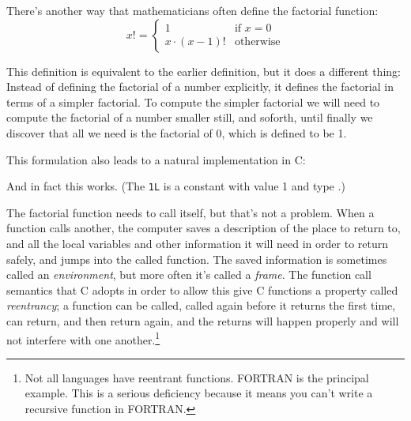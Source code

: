 There's another way that mathematicians often define the factorial
function:
\[ x! = \left\{ \begin{array}{ll}
	       1  & \mbox{if $x = 0$} \\
	       x\cdot(x-1)! & \mbox{otherwise}
		\end{array}
\right. \]

This definition is equivalent to the earlier definition, but it does a
different thing:  Instead of defining the factorial of a number
explicitly, it defines the factorial in terms of a simpler factorial.
To compute the simpler factorial we will need to compute the factorial
of a number smaller still, and soforth, until finally we discover that
all we need is the factorial of 0, which is defined to be 1.  

This formulation also leads to a natural implementation in C:

\begin{flushleft}
\verb% long int fact(unsigned int n) % \\*
\verb% { % \\*
\verb%  % \\*
\verb%   if (n == 0) % \\*
\verb%     return 1L; % \\*
\verb%   else % \\*
\verb%     return n * fact(n-1); % \\*
\verb% } % \\*
\end{flushleft}

And in fact this works. (The {\tt 1L} is a constant with value
1 and type \longint.)

The factorial function needs to call itself, but that's not a problem.
When a function calls another, the computer saves a description of the
place to return to, and all the local variables and other information it
will need in order to return safely, and jumps into the called function.
The saved information is sometimes called an {\em environment}\/, but
more often it's called a {\em frame}\/.  The function call semantics
that C adopts in order to allow this give C functions a property called
{\em reentrancy}\/; a function can be called, called again before it
returns the first time, can return, and then return again, and the
returns will happen properly and will not interfere with one
another.\footnote{Not all languages have reentrant functions.  FORTRAN
is the principal example.  This is a serious deficiency because it means
you can't write a recursive function in FORTRAN.}


